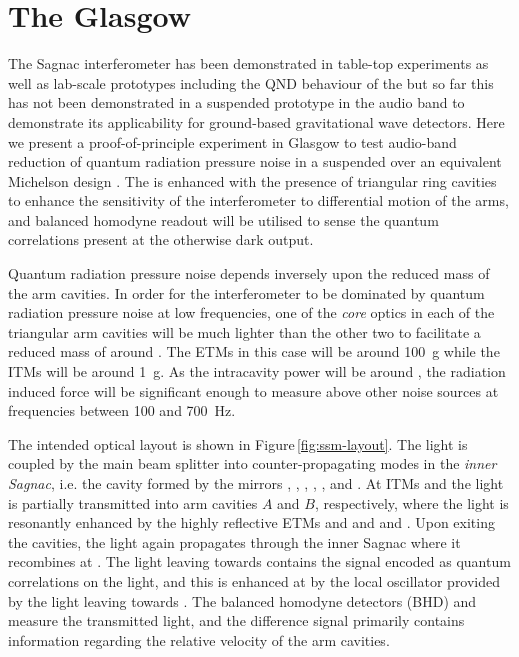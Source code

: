 \section{The Glasgow \SSMEXPT{}}
The Sagnac interferometer has been demonstrated in table-top experiments \cite{Shaddock1998} as well as lab-scale prototypes \cite{Beyersdorf2002} including the \gls{QND} behaviour of the \SSM{} \cite{Eberle2010} but so far this has not been demonstrated in a suspended prototype in the audio band to demonstrate its applicability for ground-based gravitational wave detectors. Here we present a proof-of-principle experiment in Glasgow to test audio-band reduction of quantum radiation pressure noise in a suspended \SSM{} over an equivalent Michelson design \cite{Graef2014}. The \SSM{} is enhanced with the presence of triangular ring cavities to enhance the sensitivity of the interferometer to differential motion of the arms, and balanced homodyne readout will be utilised to sense the quantum correlations present at the otherwise dark output.

Quantum radiation pressure noise depends inversely upon the reduced mass of the arm cavities. In order for the interferometer to be dominated by quantum radiation pressure noise at low frequencies, one of the \emph{core} optics in each of the triangular arm cavities will be much lighter than the other two to facilitate a reduced mass of around . The \glspl{ETM} in this case will be around \SI{100}{\gram} while the \glspl{ITM} will be around \SI{1}{\gram}. As the intracavity power will be around , the radiation induced force will be significant enough to measure above other noise sources at frequencies between \num{100} and \SI{700}{\hertz}.

The intended optical layout is shown in Figure\,\ref{fig:ssm-layout}. The light is coupled by the main beam splitter \MSIX{} into counter-propagating modes in the \emph{inner Sagnac}, i.e. the cavity formed by the mirrors \MSIX{}, \MSEVEN{}, \MONEA{}, \MTEN{}, \MNINE{}, \MEIGHT{} and \MONEB{}. At \glspl{ITM} \MONEA{} and \MONEB{} the light is partially transmitted into arm cavities $A$ and $B$, respectively, where the light is resonantly enhanced by the highly reflective \glspl{ETM} \MTWOA{} and \MTHREEA{} and \MTWOB{} and \MTHREEB{}. Upon exiting the cavities, the light again propagates through the inner Sagnac where it recombines at \MSIX{}. The light leaving \MSIX{} towards \MFOURTEEN{} contains the signal encoded as quantum correlations on the light, and this is enhanced at \MSIXTEEN{} by the local oscillator provided by the light leaving \MSIX{} towards \MTWELVE{}. The balanced homodyne detectors (\gls{BHD}) \HDA{} and \HDB{} measure the transmitted light, and the difference signal primarily contains information regarding the relative velocity of the arm cavities.

